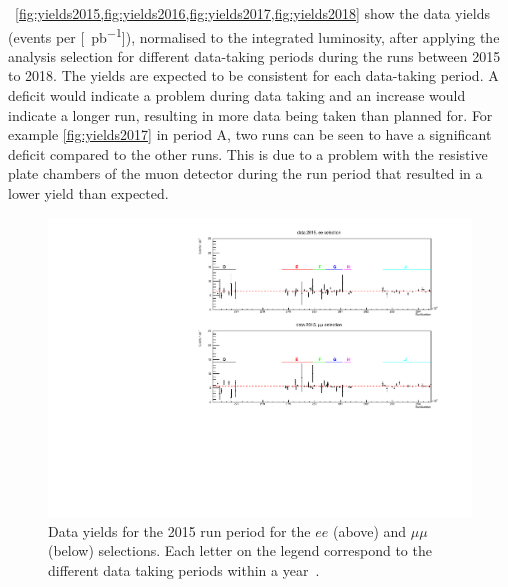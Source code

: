 ~\cref{fig:yields2015,fig:yields2016,fig:yields2017,fig:yields2018} show the data yields (events per [\SI{}{\pico\barn^{-1}}]), normalised to the integrated luminosity, after applying the analysis selection for different data-taking periods during the runs between 2015 to 2018. The yields are expected to be consistent for each data-taking period. A deficit would indicate a problem during data taking and an increase would indicate a longer run, resulting in more data being taken than planned for. For example \cref{fig:yields2017} in period A, two runs can be seen to have a significant deficit compared to the other runs. This is due to a problem with the resistive plate chambers of the muon detector during the run period that resulted in a lower yield than expected. 

\begin{figure}[ht]
\centering
\includegraphics[width=\textwidth]{figures/analysis/datamc/Yields/compare_data_yields2015.pdf}
\caption[Data yields for the 2015 run period for the $ee$ (above) and $\mu\mu$ (below) selections.]{Data yields for the 2015 run period for the $ee$ (above) and $\mu\mu$ (below) selections. Each letter on the legend correspond to the different data taking periods within a year~\cite{Aad:2019fac}.}
\label{fig:yields2015}
\end{figure}

